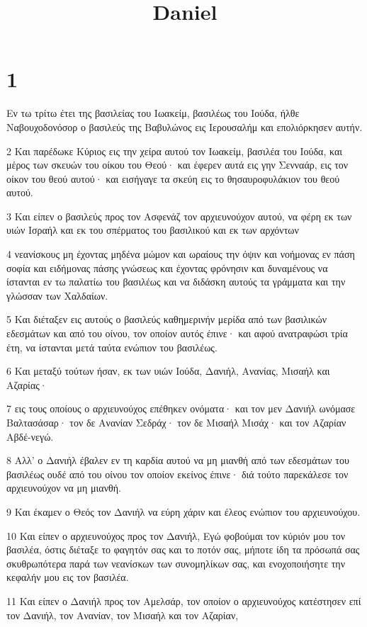 

\title{Daniel}


\chapter{1}

\par Εν τω τρίτω έτει της βασιλείας του Ιωακείμ, βασιλέως του Ιούδα, ήλθε Ναβουχοδονόσορ ο βασιλεύς της Βαβυλώνος εις Ιερουσαλήμ και επολιόρκησεν αυτήν.
\par 2 Και παρέδωκε Κύριος εις την χείρα αυτού τον Ιωακείμ, βασιλέα του Ιούδα, και μέρος των σκευών του οίκου του Θεού· και έφερεν αυτά εις γην Σενναάρ, εις τον οίκον του θεού αυτού· και εισήγαγε τα σκεύη εις το θησαυροφυλάκιον του θεού αυτού.
\par 3 Και είπεν ο βασιλεύς προς τον Ασφενάζ τον αρχιευνούχον αυτού, να φέρη εκ των υιών Ισραήλ και εκ του σπέρματος του βασιλικού και εκ των αρχόντων
\par 4 νεανίσκους μη έχοντας μηδένα μώμον και ωραίους την όψιν και νοήμονας εν πάση σοφία και ειδήμονας πάσης γνώσεως και έχοντας φρόνησιν και δυναμένους να ίστανται εν τω παλατίω του βασιλέως και να διδάσκη αυτούς τα γράμματα και την γλώσσαν των Χαλδαίων.
\par 5 Και διέταξεν εις αυτούς ο βασιλεύς καθημερινήν μερίδα από των βασιλικών εδεσμάτων και από του οίνου, τον οποίον αυτός έπινε· και αφού ανατραφώσι τρία έτη, να ίστανται μετά ταύτα ενώπιον του βασιλέως.
\par 6 Και μεταξύ τούτων ήσαν, εκ των υιών Ιούδα, Δανιήλ, Ανανίας, Μισαήλ και Αζαρίας·
\par 7 εις τους οποίους ο αρχιευνούχος επέθηκεν ονόματα· και τον μεν Δανιήλ ωνόμασε Βαλτασάσαρ· τον δε Ανανίαν Σεδράχ· τον δε Μισαήλ Μισάχ· και τον Αζαρίαν Αβδέ-νεγώ.
\par 8 Αλλ' ο Δανιήλ έβαλεν εν τη καρδία αυτού να μη μιανθή από των εδεσμάτων του βασιλέως ουδέ από του οίνου τον οποίον εκείνος έπινε· διά τούτο παρεκάλεσε τον αρχιευνούχον να μη μιανθή.
\par 9 Και έκαμεν ο Θεός τον Δανιήλ να εύρη χάριν και έλεος ενώπιον του αρχιευνούχου.
\par 10 Και είπεν ο αρχιευνούχος προς τον Δανιήλ, Εγώ φοβούμαι τον κύριόν μου τον βασιλέα, όστις διέταξε το φαγητόν σας και το ποτόν σας, μήποτε ίδη τα πρόσωπά σας σκυθρωπότερα παρά των νεανίσκων των συνομηλίκων σας, και ενοχοποιήσητε την κεφαλήν μου εις τον βασιλέα.
\par 11 Και είπεν ο Δανιήλ προς τον Αμελσάρ, τον οποίον ο αρχιευνούχος κατέστησεν επί τον Δανιήλ, τον Ανανίαν, τον Μισαήλ και τον Αζαρίαν,
